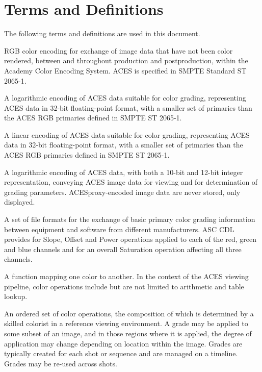 \numberedformat
\chapter{Terms and Definitions}
The following terms and definitions are used in this document.

RGB color encoding for exchange of image data that have not been color rendered, between and throughout production and postproduction, within the Academy Color Encoding System. ACES is specified in SMPTE Standard ST 2065-1.

A logarithmic encoding of ACES data suitable for color grading, representing ACES data in 32-bit floating-point format, with a smaller set of primaries than the ACES RGB primaries defined in SMPTE ST 2065-1.

A linear encoding of ACES data suitable for color grading, representing ACES data in 32-bit floating-point format, with a smaller set of primaries than the ACES RGB primaries defined in SMPTE ST 2065-1.

A logarithmic encoding of ACES data, with both a 10-bit and 12-bit integer representation, conveying ACES image data for viewing and for determination of grading parameters. ACESproxy-encoded image data are never stored, only displayed.

A set of file formats for the exchange of basic primary color grading information between equipment and software from different manufacturers. ASC CDL provides for Slope, Offset and Power operations applied to each of the red, green and blue channels and for an overall Saturation operation affecting all three channels.

A function mapping one color to another. In the context of the ACES viewing pipeline, color operations include but are not limited to arithmetic and table lookup.

An ordered set of color operations, the composition of which is determined by a skilled colorist in a reference viewing environment. A grade may be applied to some subset of an image, and in those regions where it is applied, the degree of application may change depending on location within the image. Grades are typically created for each shot or sequence and are managed on a timeline. Grades may be re-used across shots.

